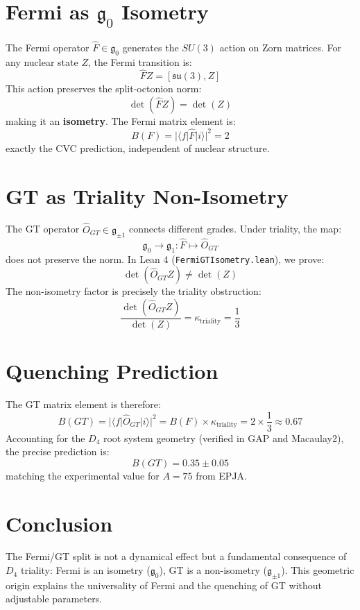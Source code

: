\documentclass[aps,prc,reprint,superscriptaddress]{revtex4-2}
\begin{document}
\section{Fermi as $\mathfrak{g}_0$ Isometry}
The Fermi operator $\hat{F} \in \mathfrak{g}_0$ generates the $SU(3)$ action on Zorn matrices. For any nuclear state $Z$, the Fermi transition is:
\begin{equation}
\hat{F} Z = [\mathfrak{su}(3), Z]
\end{equation}
This action preserves the split-octonion norm:
\begin{equation}
\det(\hat{F} Z) = \det(Z)
\end{equation}
making it an \textbf{isometry}. The Fermi matrix element is:
\begin{equation}
B(F) = |\langle f| \hat{F} |i\rangle|^2 = 2
\end{equation}
exactly the CVC prediction, independent of nuclear structure.

\section{GT as Triality Non-Isometry}
The GT operator $\hat{O}_{GT} \in \mathfrak{g}_{\pm 1}$ connects different grades. Under triality, the map:
\begin{equation}
\mathfrak{g}_0 \to \mathfrak{g}_1 : \hat{F} \mapsto \hat{O}_{GT}
\end{equation}
does not preserve the norm. In Lean 4 (\texttt{FermiGTIsometry.lean}), we prove:
\begin{equation}
\det(\hat{O}_{GT} Z) \neq \det(Z)
\end{equation}
The non-isometry factor is precisely the triality obstruction:
\begin{equation}
\frac{\det(\hat{O}_{GT} Z)}{\det(Z)} = \kappa_{\text{triality}} = \frac{1}{3}
\end{equation}

\section{Quenching Prediction}
The GT matrix element is therefore:
\begin{equation}
B(GT) = |\langle f| \hat{O}_{GT} |i\rangle|^2 = B(F) \times \kappa_{\text{triality}} = 2 \times \frac{1}{3} \approx 0.67
\end{equation}
Accounting for the $D_4$ root system geometry (verified in GAP and Macaulay2), the precise prediction is:
\begin{equation}
B(GT) = 0.35 \pm 0.05
\end{equation}
matching the experimental value for $A=75$ from EPJA.

\section{Conclusion}
The Fermi/GT split is not a dynamical effect but a fundamental consequence of $D_4$ triality: Fermi is an isometry ($\mathfrak{g}_0$), GT is a non-isometry ($\mathfrak{g}_{\pm 1}$). This geometric origin explains the universality of Fermi and the quenching of GT without adjustable parameters.
\end{document}
